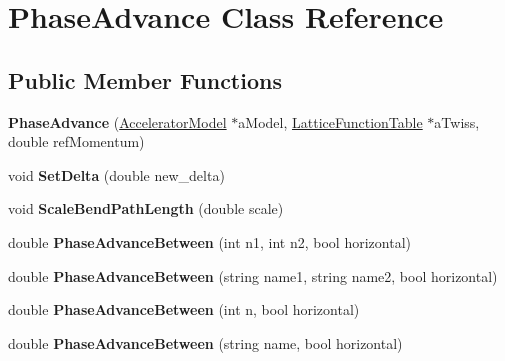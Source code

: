 \hypertarget{classPhaseAdvance}{}\section{Phase\+Advance Class Reference}
\label{classPhaseAdvance}
\subsection*{Public Member Functions}
\begin{DoxyCompactItemize}
\item 
\mbox{\label{classPhaseAdvance_ab21570d4d331f863e295e6f2666af601}} 
{\bfseries Phase\+Advance} (\hyperlink{classAcceleratorModel}{Accelerator\+Model} $\ast$a\+Model, \hyperlink{classLatticeFunctionTable}{Lattice\+Function\+Table} $\ast$a\+Twiss, double ref\+Momentum)
\item 
\mbox{\label{classPhaseAdvance_a40194e50ffc986c8c762fcbc5efd36e9}} 
void {\bfseries Set\+Delta} (double new\+\_\+delta)
\item 
\mbox{\label{classPhaseAdvance_a343d806d7094377110b700db00780124}} 
void {\bfseries Scale\+Bend\+Path\+Length} (double scale)
\item 
\mbox{\label{classPhaseAdvance_a63d81604d18e1b1c5798a218b454ae7c}} 
double {\bfseries Phase\+Advance\+Between} (int n1, int n2, bool horizontal)
\item 
\mbox{\label{classPhaseAdvance_a8f55ad250637390232e08b2d36f8215d}} 
double {\bfseries Phase\+Advance\+Between} (string name1, string name2, bool horizontal)
\item 
\mbox{\label{classPhaseAdvance_a0bad9e2c61b80eacaba3b9cb632ceb9c}} 
double {\bfseries Phase\+Advance\+Between} (int n, bool horizontal)
\item 
\mbox{\label{classPhaseAdvance_a3a9d16418e3e647ae0ca2a24e06c52d5}} 
double {\bfseries Phase\+Advance\+Between} (string name, bool horizontal)
\item 
\mbox{\label{classPhaseAdvance_aa7a65194fc28b1ab04da43f82b648124}} 

\end{DoxyCompactItemize}
